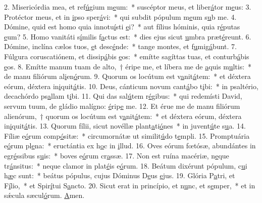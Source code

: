2. Misericórdia mea, et ref\uline{ú}gium m\uline{e}um:~* suscéptor meus, et liber\uline{á}tor m\uline{e}us:
3. Protéctor meus, et in \uline{i}pso sper\uline{á}vi:~* qui subdit pópulum m\uline{e}um s\uline{u}b me.
4. Dómine, quid est homo quia innotu\uline{í}sti \uline{e}i?~* aut fílius hóminis, quia r\uline{é}putas \uline{e}um?
5. Homo vanitáti s\uline{í}milis f\uline{a}ctus est:~* dies ejus sicut \uline{u}mbra præt\uline{é}reunt.
6. Dómine, inclína cælos tuos, \uline{e}t desc\uline{é}nde:~* tange montes, et f\uline{u}mig\uline{á}bunt.
7. Fúlgura coruscatiónem, et dissip\uline{á}bis \uline{e}os:~* emítte sagíttas tuas, et conturb\uline{á}bis \uline{e}os.
8. Emítte manum tuam de alto,~† éripe me, et líbera me de \uline{a}quis m\uline{u}ltis:~* de manu filiórum al\uline{i}en\uline{ó}rum.
9. Quorum os locútum est v\uline{a}nit\uline{á}tem:~* et déxtera eórum, déxtera in\uline{i}quit\uline{á}tis.
10. Deus, cánticum novum cant\uline{á}bo t\uline{i}bi:~* in psaltério, decachórdo ps\uline{a}llam t\uline{i}bi.
11. Qui das sal\uline{ú}tem r\uline{é}gibus:~* qui redemísti David, servum tuum, de gládio malígno: \uline{é}rip\uline{e} me.
12. Et érue me de manu filiórum alienórum,~† quorum os locútum est v\uline{a}nit\uline{á}tem:~* et déxtera eórum, déxtera in\uline{i}quit\uline{á}tis.
13. Quorum fílii, sicut novéllæ plant\uline{a}ti\uline{ó}nes~* in juvent\uline{ú}te s\uline{u}a.
14. Fíliæ e\uline{ó}rum comp\uline{ó}sitæ:~* circumornátæ ut similit\uline{ú}do t\uline{e}mpli.
15. Promptuária e\uline{ó}rum pl\uline{e}na:~* eructántia ex h\uline{o}c in \uline{i}llud.
16. Oves eórum fœtósæ, abundántes in egr\uline{é}ssibus s\uline{u}is:~* boves e\uline{ó}rum cr\uline{a}ssæ.
17. Non est ruína macériæ, n\uline{e}que tr\uline{á}nsitus:~* neque clamor in plat\uline{é}is e\uline{ó}rum.
18. Beátum dixérunt pópulum, c\uline{u}i h\uline{æ}c sunt:~* beátus pópulus, cujus Dóminus D\uline{e}us \uline{e}jus.
19. Glória P\uline{a}tri, et F\uline{í}lio,~* et Spir\uline{í}tui S\uline{a}ncto.
20. Sicut erat in princípio, et n\uline{u}nc, et s\uline{e}mper,~* et in sǽcula sæcul\uline{ó}rum. \uline{A}men.
